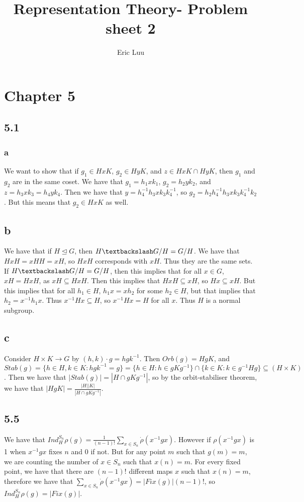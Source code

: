 \documentclass[]{article}
\title{Representation Theory- Problem sheet 2}
\author{Eric Luu}
\begin{document}
\maketitle

\section*{Chapter 5}
\subsection*{5.1}
\subsubsection*{a}
We want to show that if $g_1 \in HxK$, $g_2 \in H y K$, and $z \in Hx K \cap H y K$, then $g_1$ and $g_2$ are in the same coset. We have that $g_1 = h_1 x k_1$, $g_2 = h_2 y k_2$, and $z = h_3 x k_3 = h_4 y k_4$. Then we have that $y = h_4^{-1} h_3 x k_3 k_4^{-1}$, so $g_2 = h_2 h_4^{-1} h_3 x k_3 k_4^{-1} k_2$. But this means that $g_2 \in H x K$ as well. 
\subsection*{b}
We have that if $H \unlhd G$, then $H \textbackslash G / H = G/H$. We have that $H x H = x HH = x H$, so $H x H$ corresponds with $xH$. Thus they are the same sets. If $H \textbackslash G / H = G/H$, then this implies that for all $x \in G$, $xH = H x H$, as $xH \subseteq H x H$. Then this implies that $H x H \subseteq x H$, so $Hx \subseteq x H$. But this implies that for all $h_1 \in H$, $h_1 x = x h_2$ for some $h_2 \in H$, but that implies that $h_2 = x^{-1} h_1 x$. Thus $x^{-1} H x \subseteq H$, so $x^{-1} H x = H$ for all $x$. Thus $H$ is a normal subgroup. 

\subsection*{c}
Consider $H \times K \rightarrow G$ by $(h, k) \cdot g = h g k^{-1}$. Then $Orb(g) = H g K$, and $Stab(g) = \lbrace h \in H, k \in K: hgk^{-1} = g \rbrace = \lbrace h \in H : h \in g K g^{-1} \rbrace \cap \lbrace k \in K: k \in g^{-1} H g\rbrace \subseteq(H \times K)$. Then we have that $|Stab(g)| = |H \cap g K g^{-1}|$, so by the orbit-stabiliser theorem, we have that $|H g K| = \frac{|H| |K|}{|H \cap g K g^{-1}|}$.


\subsection*{5.5}
We have that $Ind_H^{S_n} \rho(g) = \frac{1}{(n-1)!} \sum_{x \in S_n}\dot{\rho}(x^{-1} g x)$. However if $\rho(x^{-1} g x)$ is 1 when $x^{-1} g x$ fixes $n$ and $0$ if not. But for any point $m$ such that $g(m) = m$, we are counting the number of $x \in S_n$ such that $x(n) = m$. For every fixed point, we have that there are $(n-1)!$ different maps $x$ such that $x(n) = m$, therefore we have that $\sum_{x \in S_n}\dot{\rho}(x^{-1} g x) = |Fix(g)| (n-1)!$, so $Ind_H^{S_n} \rho(g) = |Fix(g)|$.
\end{document}
